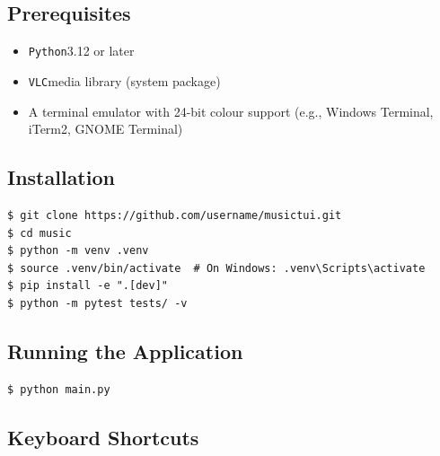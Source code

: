\documentclass[a4paper,11pt,twoside]{article}
\newcommand{\py}{\texttt{Python}}
\newcommand{\vlc}{\texttt{VLC}}
\begin{document}
\subsection{Prerequisites}

\begin{itemize}
    \item \py 3.12 or later
    \item \vlc media library (system package)
    \item A terminal emulator with 24-bit colour support
          (e.g., Windows Terminal, iTerm2, GNOME Terminal)
\end{itemize}

\subsection{Installation}

\begin{lstlisting}[style=console, caption={Installation instructions.}]
$ git clone https://github.com/username/musictui.git
$ cd music
$ python -m venv .venv
$ source .venv/bin/activate  # On Windows: .venv\Scripts\activate
$ pip install -e ".[dev]"
$ python -m pytest tests/ -v
\end{lstlisting}

\subsection{Running the Application}

\begin{lstlisting}[style=console, caption={Launching the application.}]
$ python main.py
\end{lstlisting}

\subsection{Keyboard Shortcuts}
\end{document}
